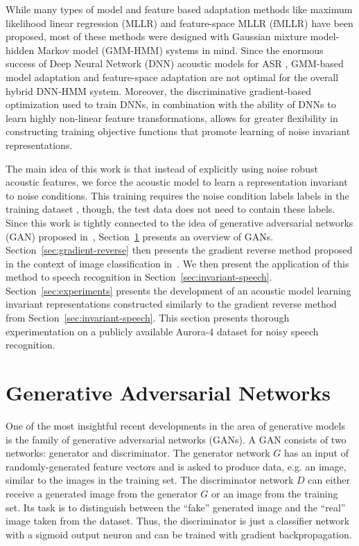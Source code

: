 \documentclass{article}
\begin{document}
    While many types of model and feature based adaptation methods like maximum likelihood linear regression (MLLR) and feature-space MLLR (fMLLR)
    \cite{leggetter1995maximum} have been proposed, most of these methods were
    designed with Gaussian mixture model-hidden Markov model (GMM-HMM) systems in mind. Since the enormous success of
    Deep Neural Network (DNN) acoustic models for ASR \cite{hinton2012deep}, GMM-based
    model adaptation and feature-space adaptation are not optimal for the overall hybrid DNN-HMM system.
    Moreover, the discriminative gradient-based optimization used to train
    DNNs, in combination with the ability of DNNs to learn highly non-linear
    feature transformations, allows for greater flexibility in
    constructing training objective functions that promote learning of noise invariant
    representations.

    The main idea of this work is that instead of explicitly using noise robust acoustic features,
    we force the acoustic model to learn a representation invariant to noise 
    conditions. This training requires the noise condition labels labels in the training dataset
    , though, the 
    test data does not need to contain these labels. Since this work is tightly connected to the idea
    of generative adversarial networks (GAN) proposed 
    in~\cite{goodfellow2014generative}, Section~\ref{sec:gans} presents an overview of GANs. Section~\ref{sec:gradient-reverse} then presents the gradient reverse method proposed in
    the context of image classification in~\cite{ganin2014unsupervised}. We then present the application 
    of this method to speech recognition
    in Section~\ref{sec:invariant-speech}. Section~\ref{sec:experiments} presents the development of an acoustic model learning invariant
    representations constructed similarly to the gradient reverse method
    from Section~\ref{sec:invariant-speech}. This section presents thorough experimentation
    on a publicly available Aurora-4 dataset for noisy speech recognition.

\section{Generative Adversarial Networks}
\label{sec:gans}
    One of the most insightful recent developments in the area of generative models
    is the family of generative adversarial networks (GANs).
    A GAN consists of two networks: generator and discriminator. The generator 
    network $G$ has an
    input of randomly-generated feature vectors and is asked to produce data, e.g. an image, 
    similar to the images in the training set. The discriminator network $D$
    can either receive a generated image from the generator $G$ or an image
    from the training set. Its task is to distinguish
    between the ``fake'' generated image and the ``real'' image taken from the dataset. Thus,
    the discriminator is just a classifier network with a sigmoid output neuron
    and can be trained with gradient backpropagation. 
\end{document}
